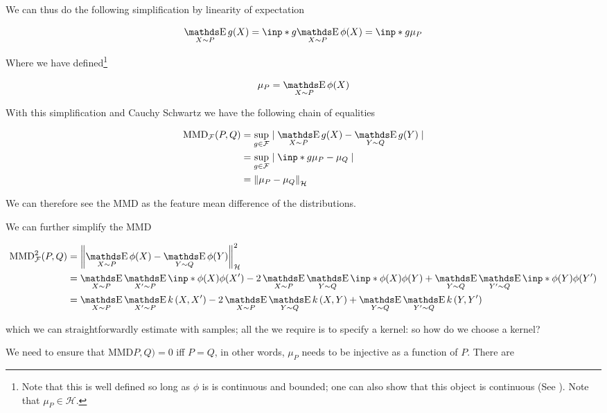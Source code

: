 We can thus do the following simplification by linearity of expectation

$$
    \mathop{\E}_{X \sim P} g(X) = 
     \inp*{g}{ \mathop{\E}_{X \sim P} \phi(X)} = \inp*{g}{\mu_P}
$$

Where we have defined\footnote{Note that this is well defined so long as $\phi$ is is continuous and bounded;
one can also show that this object is continuous (See \cite{Peters2008diploma}). Note that 
 $\mu_P \in \mathcal{H}$.}

$$
\mu_P = \mathop{\E}_{X \sim P} \phi(X)
$$

With this simplification and Cauchy Schwartz we have the following chain of equalities

\begin{align*} 
    \text{MMD}_\mathcal{F} (P, Q) 
    &= 
    \sup _{g \in \mathcal{F}} \mid \mathop{\E}_{X \sim P} g(X) - \mathop{\E}_{Y \sim Q} g(Y) \mid \\
    &= 
    \sup _{g \in \mathcal{F}} \mid \inp*{g}{\mu_P - \mu_Q} \mid \\
    &=
    \norm{\mu_P - \mu_Q}_\mathcal{H}
\end{align*}

We can therefore see the MMD as the feature mean difference of the distributions.

We can further simplify the MMD

\begin{align*}
    \text{MMD}_\mathcal{F}^2 (P, Q)
    &=
    \norm{\mathop{\E}_{X \sim P} \phi(X)  - \mathop{\E}_{Y \sim Q} \phi(Y) }_\mathcal{H}^2 \\
    &= \mathop{\E}_{X \sim P} \mathop{\E}_{X^\prime \sim P} \inp*{\phi(X)}{\phi(X^\prime)} - 
    2 \mathop{\E}_{X \sim P} \mathop{\E}_{Y \sim Q} \inp*{\phi(X)}{\phi(Y)} +
    \mathop{\E}_{Y \sim Q} \mathop{\E}_{Y^\prime \sim Q} \inp*{\phi(Y)}{\phi(Y^\prime)} \\
    &= \mathop{\E}_{X \sim P} \mathop{\E}_{X^\prime \sim P} k \left( X, X^\prime \right) - 
    2 \mathop{\E}_{X \sim P} \mathop{\E}_{Y \sim Q} k \left( X, Y \right) +
    \mathop{\E}_{Y \sim Q} \mathop{\E}_{Y^\prime \sim Q} k \left( Y, Y^\prime \right)
\end{align*}

which we can straightforwardly estimate with samples; all the we require is to specify a kernel:
so how do we choose a kernel?

We need to ensure that $\text{MMD}P, Q) = 0$ iff $P = Q$, in other words, $\mu_P$ needs to be injective
as a function of $P$. There are 

